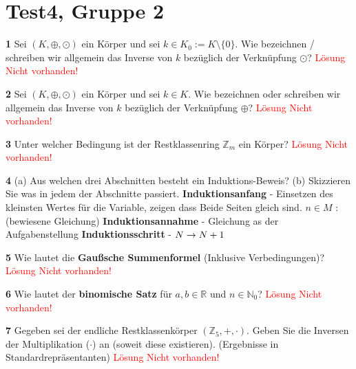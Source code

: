 \documentclass[11pt]{article}
\begin{document}
\section{Test4, Gruppe 2}

    \textbf{1} Sei \((K, \oplus, \odot)\) ein Körper und sei \(k \in K_0 := K \setminus \{0\}\). Wie bezeichnen / schreiben wir allgemein das Inverse von \(k\) bezüglich der Verknüpfung \(\odot\)?\newline
    \textcolor{red}{Lösung Nicht vorhanden!}\newline

    \textbf{2} Sei \((K, \oplus, \odot)\) ein Körper und sei \(k \in K\). Wie bezeichnen oder schreiben wir allgemein das Inverse von \(k\) bezüglich der Verknüpfung \(\oplus\)?\newline
    \textcolor{red}{Lösung Nicht vorhanden!}\newline

    \textbf{3} Unter welcher Bedingung ist der Restklassenring \(\mathbb{Z}_m\) ein Körper?\newline
    \textcolor{red}{Lösung Nicht vorhanden!}\newline

    \textbf{4} (a) Aus welchen drei Abschnitten besteht ein Induktions-Beweis? (b) Skizzieren Sie was in jedem der Abschnitte passiert.\newline\newline
    \textbf{Induktionsanfang} - Einsetzen des kleinsten Wertes für die Variable, zeigen dass Beide Seiten gleich sind. \(n \in M\) : (bewiesene Gleichung)\newline
    \textbf{Induktionsannahme} - Gleichung as der Aufgabenstellung\newline
    \textbf{Induktionsschritt} - $N \rightarrow N+1\newline$
    
    \textbf{5} Wie lautet die \textbf{Gaußsche Summenformel} (Inklusive Verbedingungen)?\newline
    \textcolor{red}{Lösung Nicht vorhanden!}\newline

    \textbf{6} Wie lautet der \textbf{binomische Satz} für \( a, b \in \mathbb{R} \) und \( n \in \mathbb{N}_0 \)?\newline
    \textcolor{red}{Lösung Nicht vorhanden!}\newline

    \textbf{7} Gegeben sei der endliche Restklassenkörper \((\mathbb{Z}_5, +, \cdot)\). Geben Sie die Inversen der Multiplikation (\(\cdot\)) an (soweit diese existieren). (Ergebnisse in Standardrepräsentanten)\newline
    \textcolor{red}{Lösung Nicht vorhanden!}\newline
\end{document}
